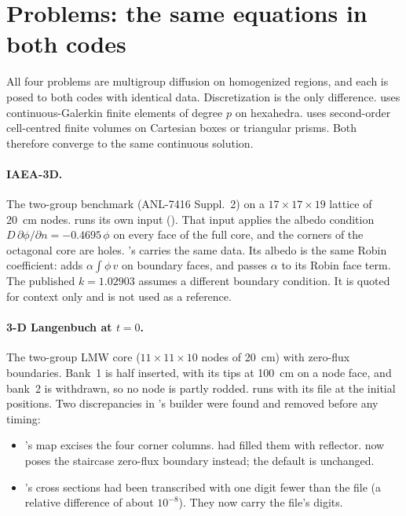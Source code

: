 \section{Problems: the same equations in both codes}
\label{sec:problems}

All four problems are multigroup diffusion on homogenized regions, and each
is posed to both codes with identical data. Discretization is the only
difference. \ffn{} uses continuous-Galerkin finite elements of degree $p$ on
hexahedra. \garnet{} uses second-order cell-centred finite volumes on
Cartesian boxes or triangular prisms. Both therefore converge to the same
continuous solution.

\paragraph{IAEA-3D.} The two-group benchmark (ANL-7416 Suppl.~2) on a
$17 \times 17 \times 19$ lattice of 20~cm nodes. \ffn{} runs its own input
(). That input applies the albedo condition
$D\,\partial\phi/\partial n = -0.4695\,\phi$ on every face of the full core,
and the corners of the octagonal core are holes. \garnet's
 carries the same data. Its albedo is the same Robin
coefficient: \ffn{}  adds
$\alpha \int \phi\,v$ on boundary faces, and \garnet{} passes $\alpha$ to its
Robin face term. The published $k = 1.02903$ assumes a different boundary
condition. It is quoted for context only and is not used as a reference.

\paragraph{3-D Langenbuch at $t = 0$.} The two-group LMW core
($11 \times 11 \times 10$ nodes of 20~cm) with zero-flux boundaries. Bank~1
is half inserted, with its tips at 100~cm on a node face, and bank~2 is
withdrawn, so no node is partly rodded. \ffn{} runs
 with its  file at the initial
positions. Two discrepancies in \garnet's builder were found and removed
before any timing:
\begin{itemize}
\item \ffn's map excises the four corner columns. \garnet{} had filled them
  with reflector.  now poses the
  staircase zero-flux boundary instead; the default is unchanged.
\item \garnet's cross sections had been transcribed with one digit fewer than
  the  file (a relative difference of about $10^{-8}$). They now
  carry the file's digits.
\end{itemize}

